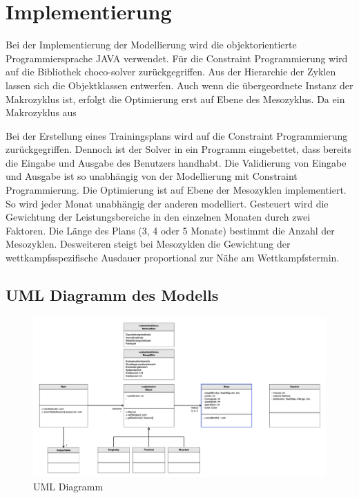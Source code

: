 \chapter{Implementierung}
\label{sec:implementierung} 
Bei der Implementierung der Modellierung wird die objektorientierte Programmiersprache JAVA \cite{java} verwendet. Für die Constraint Programmierung wird auf die Bibliothek choco-solver \cite{ChocoSolverWeb} zurückgegriffen. Aus der Hierarchie der Zyklen lassen sich die Objektklassen entwerfen. Auch wenn die übergeordnete Instanz der Makrozyklus ist, erfolgt die Optimierung erst auf Ebene des Mesozyklus. Da ein Makrozyklus aus  

Bei der Erstellung eines Trainingsplans wird auf die Constraint Programmierung zurückgegriffen. Dennoch ist der Solver in ein Programm eingebettet, dass bereits die Eingabe und Ausgabe des Benutzers handhabt. Die Validierung von Eingabe und Ausgabe ist so unabhängig von der Modellierung mit Constraint Programmierung. Die Optimierung ist auf Ebene der Mesozyklen implementiert. So wird jeder Monat unabhängig der anderen modelliert. Gesteuert wird die Gewichtung der Leistungsbereiche in den einzelnen Monaten durch zwei Faktoren. Die Länge des Plans (3, 4 oder 5 Monate) bestimmt die Anzahl der Mesozyklen. Desweiteren steigt bei Mesozyklen die Gewichtung der wettkampfsspezifische Ausdauer proportional  zur Nähe am Wettkampfstermin.
\section{UML Diagramm des Modells}
\label{sec:design:UML}
\begin{figure}[htb]
	\includegraphics[width=\textwidth]{gfx/uml.png}
	\caption{UML Diagramm}
	\label{fig:system:example1}
\end{figure}

